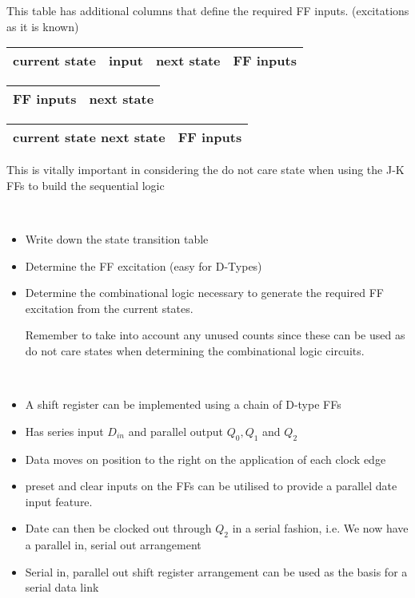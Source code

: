 \documentclass[a4paper]{article}
\begin{document}
\begin{defi}
This table has additional columns that define the required FF inputs. (excitations as it is known)\\
\begin{tabular}{|c|c|c|c|}
\hline 
current state & input & next state & FF inputs \\ 
\hline 
\end{tabular} 
\end{defi}
\begin{defi}
\begin{tabular}{|c|c|}
\hline 
FF inputs & next state \\ 
\hline 
\end{tabular} 
\end{defi}
\begin{defi}
\begin{tabular}{|c|c|}
\hline 
current state next state & FF inputs \\ 
\hline 
\end{tabular} 
\begin{note}
This is vitally important in considering the do not care state when using the J-K FFs to build the sequential logic
\end{note}
\end{defi}

\begin{defi}
\ 
\begin{itemize}
\item Write down the state transition table
\item Determine the FF excitation (easy for D-Types)
\item Determine the combinational logic necessary to generate the required FF excitation from the current states.
\begin{wn}
Remember to take into account any unused counts since these can be used as do not care states when determining the combinational logic circuits.
\end{wn}
\end{itemize}
\end{defi}


\begin{defi}
\ 
\begin{itemize}
\item A shift register can be implemented using a chain of D-type FFs
\item Has series input $D_{in}$ and parallel output $Q_0,Q_1$ and $Q_2$
\item Data moves on position to the right on the application of each clock edge
\item preset and clear inputs on the FFs can be utilised to provide a parallel date input feature.
\item Date can then be clocked out through $Q_2$ in a serial fashion, i.e. We now have a parallel in, serial out arrangement
\item Serial in, parallel out shift register arrangement can be used as the basis for a serial data link
\end{itemize}
\end{defi}
\end{document}
